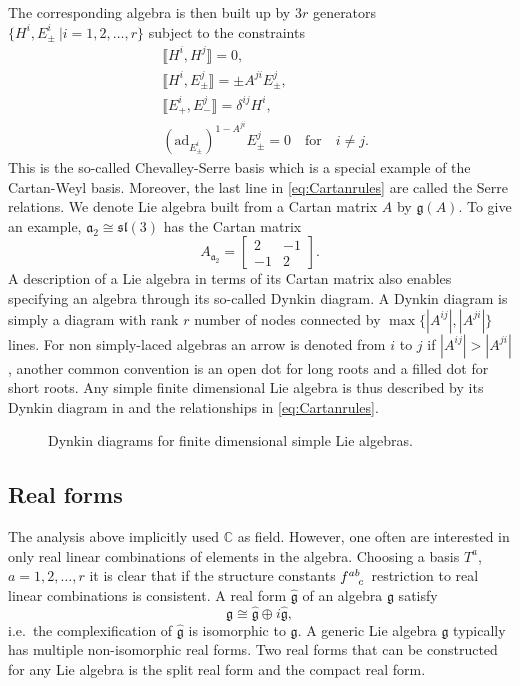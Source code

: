 The corresponding algebra is then built up by $3r$ generators $\{H^i,E_{\pm}^i\ |i=1,2,\ldots,r\}$ subject to the constraints
\begin{equation}
\begin{aligned}\label{eq:Cartanrules}
    &\llbracket H^i,H^j\rrbracket = 0,\\
    &\llbracket H^i,E_{\pm}^j\rrbracket = \pm A^{ji}E_{\pm}^{j},\\
    &\llbracket E_+^i,E_-^j\rrbracket = \delta^{ij}H^i,\\
    &(\text{ad}_{E_{\pm}^i})^{1-A^{ji}}E^j_\pm = 0 \quad \text{for} \quad i\neq j.
\end{aligned}
\end{equation}
This is the so-called Chevalley-Serre basis which is a special example of the Cartan-Weyl basis. Moreover, the last line in \eqref{eq:Cartanrules} are called the Serre relations. We denote Lie algebra built from a Cartan matrix $A$ by $\mathfrak{g}(A)$. To give an example, $\mathfrak{a}_2\cong \mathfrak{sl}(3)$ has the Cartan matrix
\begin{equation}
    A_\mathfrak{a_2}=\begin{bmatrix}2&-1\\-1&2\end{bmatrix}.
\end{equation}
A description of a Lie algebra in terms of its Cartan matrix also enables specifying an algebra through its so-called Dynkin diagram. A Dynkin diagram is simply a diagram with rank $r$ number of nodes connected by $\max\{|A^{ij}|,|A^{ji}|\}$ lines. For non simply-laced algebras an arrow is denoted from $i$ to $j$ if $|A^{ij}|>|A^{ji}|$, another common convention is an open dot for long roots and a filled dot for short roots. Any simple finite dimensional Lie algebra is thus described by its Dynkin diagram in  and the relationships in \eqref{eq:Cartanrules}.
\begin{figure}
    \centering
    \AllDynkin
    \caption{Dynkin diagrams for finite dimensional simple Lie algebras.}
    \label{fig:AllDynkin}
\end{figure}




\subsection{Real forms}
The analysis above implicitly used $\mathbb{C}$ as field. However, one often are interested in only real linear combinations of elements in the algebra. Choosing a basis $T^a$, $a=1,2,\ldots, r$ it is clear that if the structure constants $\tensor{f}{^{ab}_c}$ restriction to real linear combinations is consistent. A real form $\hat{\mathfrak{g}}$ of an algebra $\mathfrak{g}$ satisfy
\begin{equation}
    \mathfrak{g} \cong \hat{\mathfrak{g}}\oplus i\hat{\mathfrak{g}},
\end{equation}
i.e.\ the complexification of $\hat{\mathfrak{g}}$ is isomorphic to $\mathfrak{g}$. A generic Lie algebra $\mathfrak{g}$ typically has multiple non-isomorphic real forms. Two real forms that can be constructed for any Lie algebra is the split real form and the compact real form.

